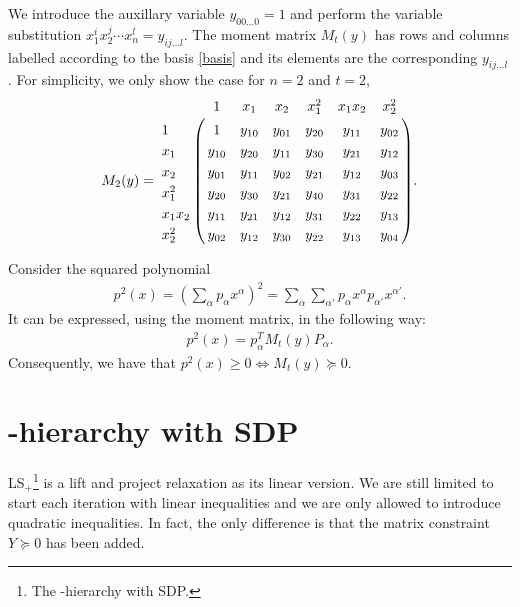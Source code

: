 \documentclass[a4paper,twoside,justified]{tufte-handout}
\begin{document}
We introduce the auxillary variable $y_{00\ldots 0}=1$ and perform the variable substitution $x_1^ix_2^j\cdots x_n^l=y_{ij\ldots l}$. The moment matrix $M_t(y)$ has rows and columns labelled according to the basis \eqref{basis} and its elements are the corresponding $y_{ij\ldots l}$. For simplicity, we only show the case for $n=2$ and $t=2$, 
\begin{eqnarray*}
M_2(y)=
\bordermatrix{~ & 1            & x_1     &x_2      &x_1^2 &x_1x_2&x_2^2 \cr
                         1 & 1           & y_{10} & y_{01}&y_{20}&y_{11}&y_{02} \cr
                     x_1 & y_{10}  & y_{20} & y_{11}&y_{30}&y_{21}&y_{12} \cr
                     x_2 & y_{01}  & y_{11} & y_{02}&y_{21}&y_{12}&y_{03} \cr
                x_1^2 & y_{20}  & y_{30} & y_{21}&y_{40}&y_{31}&y_{22} \cr
             x_1x_2  & y_{11}  & y_{21} & y_{12}&y_{31}&y_{22}&y_{13} \cr
            x_2^2     & y_{02}  & y_{12} & y_{30}&y_{22}&y_{13}&y_{04} \cr}.
\end{eqnarray*}

Consider the squared polynomial
\begin{eqnarray*}
p^2(x)=(\sum_{\alpha}p_{\alpha}x^{\alpha})^2=\sum_{\alpha}\sum_{\alpha'}p_{\alpha}x^{\alpha}p_{\alpha'}x^{\alpha'}.
\end{eqnarray*}
It can be expressed, using the moment matrix, in the following way:
\begin{eqnarray*}
p^2(x)=p_{\alpha}^TM_t(y)P_{\alpha}.
\end{eqnarray*}
Consequently, we have that $p^2(x)\geq0\Leftrightarrow M_t(y)\succeq0$.

\section{\Lovasz-\Schrijver hierarchy with SDP}
 LS$_+$\footnote{The \Lovasz-\Schrijver hierarchy with SDP.} is a lift and project relaxation as its linear version. We are still limited to start each iteration with linear inequalities and we are only allowed to introduce quadratic inequalities. In fact, the only difference is that the matrix constraint $Y\succeq0$ has been added.
\end{document}
